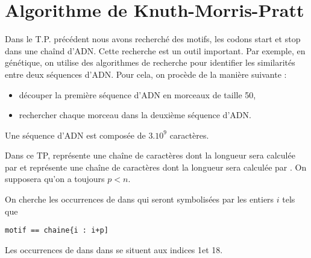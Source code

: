 \chapter{Algorithme de Knuth-Morris-Pratt}
\thispagestyle{empty}
\vskip -1cm

{\sf Dans le T.P. précédent nous avons recherché des motifs, les codons {\sc start} et {\sc stop} dans une chaînd d'ADN. Cette recherche est un outil important. Par exemple, en génétique, on utilise des algorithmes de recherche pour identifier les similarités entre deux séquences d’ADN. Pour cela, on procède de la manière suivante :
\begin{itemize}
    \item découper la première séquence d’ADN en morceaux de taille 50,
    \item rechercher chaque morceau dans la deuxième séquence d’ADN.
\end{itemize}
Une séquence d’ADN est composée de $3.10^9$ caractères.
}

Dans ce TP,  représente une chaîne de caractères dont la longueur sera calculée par  et  représente une chaîne de caractères dont la longueur sera calculée par . On supposera qu'on a toujours $p < n$.

On cherche les occurrences de  dans  qui seront symbolisées par les entiers $i$ tels que 
\begin{lstlisting}
motif == chaine{i : i+p]
\end{lstlisting}

Les occurrences de  dans dans  se situent aux indices 1et 18.
